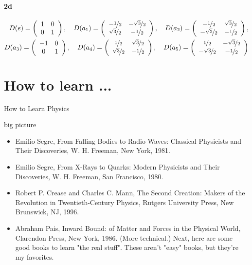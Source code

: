 \documentclass[10pt,a4paper]{book}
\theoremstyle{definition}
\begin{document}
\subsubsection{2d}
\begin{align}
D(e)=\left(\begin{array}{cc}
1 & 0\\
0 & 1
\end{array}
\right),\quad
D(a_1)=\left(\begin{array}{cc}
-\nicefrac{1}{2} & -\nicefrac{\sqrt{3}}{2}\\
 \nicefrac{\sqrt{3}}{2} & -\nicefrac{1}{2}
\end{array}
\right),\quad
D(a_2)=\left(\begin{array}{cc}
-\nicefrac{1}{2} & \nicefrac{\sqrt{3}}{2}\\
-\nicefrac{\sqrt{3}}{2} & -\nicefrac{1}{2}
\end{array}
\right),\\
D(a_3)=\left(\begin{array}{cc}
-1 & 0\\
0 & 1
\end{array}
\right),\quad
D(a_4)=\left(\begin{array}{cc}
\nicefrac{1}{2} & \nicefrac{\sqrt{3}}{2}\\
\nicefrac{\sqrt{3}}{2} & -\nicefrac{1}{2}
\end{array}
\right),\quad
D(a_5)=\left(\begin{array}{cc}
\nicefrac{1}{2} & -\nicefrac{\sqrt{3}}{2}\\
-\nicefrac{\sqrt{3}}{2} & -\nicefrac{1}{2}
\end{array}
\right)
\end{align}

\chapter{How to learn ...}
How to Learn Physics

big picture
\begin{itemize}
\item Emilio Segre, From Falling Bodies to Radio Waves: Classical Physicists and Their Discoveries, W. H. Freeman, New York, 1981.

\item Emilio Segre, From X-Rays to Quarks: Modern Physicists and Their Discoveries, W. H. Freeman, San Francisco, 1980.

\item Robert P. Crease and Charles C. Mann, The Second Creation: Makers of the Revolution in Twentieth-Century Physics, Rutgers University Press, New Brunswick, NJ, 1996.

\item Abraham Pais, Inward Bound: of Matter and Forces in the Physical World, Clarendon Press, New York, 1986. (More technical.)
Next, here are some good books to learn "the real stuff". These aren't "easy" books, but they're my favorites.
\end{itemize}
\end{document}
